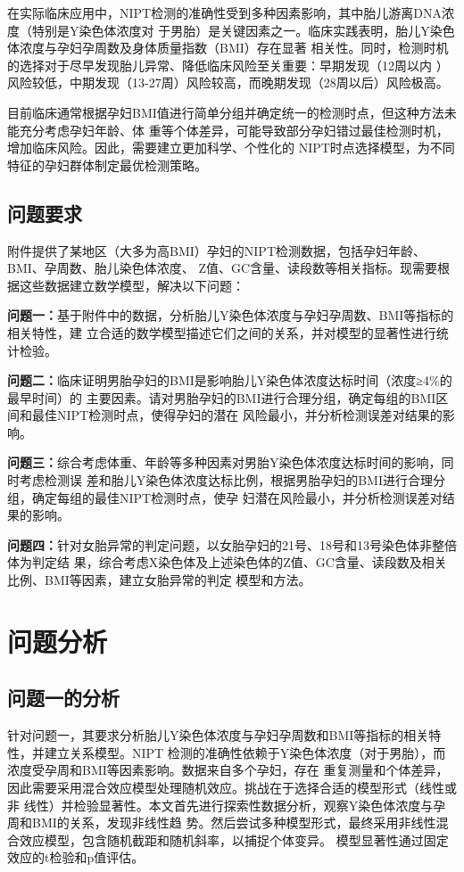 \documentclass{article}
\begin{document}
在实际临床应用中，NIPT检测的准确性受到多种因素影响，其中胎儿游离DNA浓度（特别是Y染色体浓度对
于男胎）是关键因素之一。临床实践表明，胎儿Y染色体浓度与孕妇孕周数及身体质量指数（BMI）存在显著
相关性。同时，检测时机的选择对于尽早发现胎儿异常、降低临床风险至关重要：早期发现（12周以内
）风险较低，中期发现（13-27周）风险较高，而晚期发现（28周以后）风险极高。

目前临床通常根据孕妇BMI值进行简单分组并确定统一的检测时点，但这种方法未能充分考虑孕妇年龄、体
重等个体差异，可能导致部分孕妇错过最佳检测时机，增加临床风险。因此，需要建立更加科学、个性化的
NIPT时点选择模型，为不同特征的孕妇群体制定最优检测策略。

\subsection{\textbf{问题要求}}
附件提供了某地区（大多为高BMI）孕妇的NIPT检测数据，包括孕妇年龄、BMI、孕周数、胎儿染色体浓度、
Z值、GC含量、读段数等相关指标。现需要根据这些数据建立数学模型，解决以下问题：

\textbf{问题一：}基于附件中的数据，分析胎儿Y染色体浓度与孕妇孕周数、BMI等指标的相关特性，建
立合适的数学模型描述它们之间的关系，并对模型的显著性进行统计检验。

\textbf{问题二：}临床证明男胎孕妇的BMI是影响胎儿Y染色体浓度达标时间（浓度≥4\%的最早时间）的
主要因素。请对男胎孕妇的BMI进行合理分组，确定每组的BMI区间和最佳NIPT检测时点，使得孕妇的潜在
风险最小，并分析检测误差对结果的影响。

\textbf{问题三：}综合考虑体重、年龄等多种因素对男胎Y染色体浓度达标时间的影响，同时考虑检测误
差和胎儿Y染色体浓度达标比例，根据男胎孕妇的BMI进行合理分组，确定每组的最佳NIPT检测时点，使孕
妇潜在风险最小，并分析检测误差对结果的影响。

\textbf{问题四：}针对女胎异常的判定问题，以女胎孕妇的21号、18号和13号染色体非整倍体为判定结
果，综合考虑X染色体及上述染色体的Z值、GC含量、读段数及相关比例、BMI等因素，建立女胎异常的判定
模型和方法。

\section{\textbf{问题分析}}
\subsection{\textbf{问题一的分析}}
针对问题一，其要求分析胎儿Y染色体浓度与孕妇孕周数和BMI等指标的相关特性，并建立关系模型。NIPT
检测的准确性依赖于Y染色体浓度（对于男胎），而浓度受孕周和BMI等因素影响。数据来自多个孕妇，存在
重复测量和个体差异，因此需要采用混合效应模型处理随机效应。挑战在于选择合适的模型形式（线性或非
线性）并检验显著性。本文首先进行探索性数据分析，观察Y染色体浓度与孕周和BMI的关系，发现非线性趋
势。然后尝试多种模型形式，最终采用非线性混合效应模型，包含随机截距和随机斜率，以捕捉个体变异。
模型显著性通过固定效应的t检验和p值评估。
\end{document}
